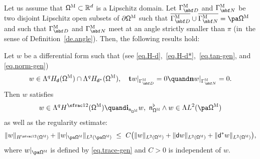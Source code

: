\begin{proposition}
\label{pr.QTN}
Let us assume that $\mathsf \Omega^{\textsc{M}}\subset \mathbb R^d$ is a Lipschitz domain. Let $\Gamma^{\textsc{M}}_{\mbf D}$
and $\Gamma^{\textsc{M}}_{\mbf N}$ be two disjoint Lipschitz open subsets of $\partial \mathsf \Omega^{\textsc{M}}$ such that $\overline{\Gamma^{\textsc{M}}_{\mbf D}} \cup \overline{\Gamma^{\textsc{M}}_{\mbf N}} = \pa
\mathsf \Omega^{\textsc{M}}$ and such that $\Gamma^{\textsc{M}}_{\mbf D}$ and $\Gamma^{\textsc{M}}_{\mbf N}$ meet at an angle
strictly smaller than $\pi$ (in~the sense of Definition~\ref{de.angle}). Then, the following results hold:

\begin{enumeratei}
\item\label{pr.QTNi}
Let $w$ be a differential form such that (see \eqref{eq.H-d},~\eqref{eq.H-d*},~\eqref{eq.tan-gen}, and \eqref{eq.norm-gen})
\[
w\in \Lambda^qH_{\mathsf d}(\mathsf \Omega^{\textsc{M}})\cap \Lambda^qH_{\mathsf d^*}(\mathsf \Omega^{\textsc{M}}), \quad
\mathbf t w|_{\Gamma^{\textsc{M}}_{\mbf D}}=0 \quand 
\mathbf n w|_{\Gamma^{\textsc{M}}_{\mbf N}}=0.
\]
Then $w$ satisfies
\[
w\in\Lambda^{q} H^{\sfrac12} (\mathsf \Omega^{\textsc{M}})\quand
\mathbf{i}_{\mathsf n_{\mathsf \Omega^{\textsc{M}}}} w,\ \mathsf n_{\mathsf \Omega^{\textsc{M}}}^{\flat} \wedge w \in
\Lambda L^2 (\pa\mathsf \Omega^{\textsc{M}})
\]
as well as the regularity estimate:
\begin{equation}\label{eq:subelliptic}
\|w\|_{ H^{\sfrac12} (\mathsf \Omega^{\textsc{M}})}+
\|w|_{\pa\mathsf \Omega^{\textsc{M}}}\|_{ L^{2} (\pa\mathsf \Omega^{\textsc{M}})}\
\leq\ C\bigl(\|w\|_{ L^{2} (\mathsf \Omega^{\textsc{M}})}
+\|\mathsf d w\|_{ L^{2} (\mathsf \Omega^{\textsc{M}})}+\|\mathsf d^*w\|_{ L^{2} (\mathsf \Omega^{\textsc{M}})} \bigr),
\end{equation}
where $w|_{\pa\mathsf \Omega^{\textsc{M}}}$ is defined by \eqref{eq.trace-gen} and $C>0$ is independent of $w$.


\end{enumeratei}
\end{proposition}
